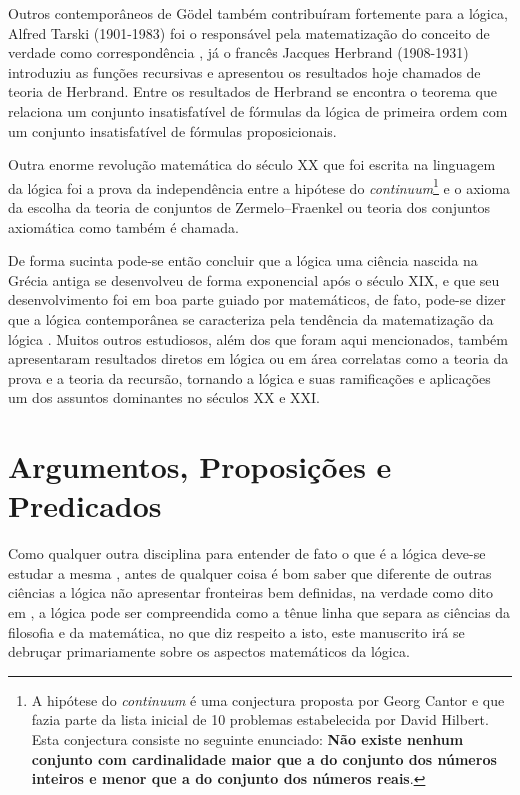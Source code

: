 Outros contemporâneos de Gödel também contribuíram fortemente para a lógica, Alfred Tarski (1901-1983) foi o responsável pela matematização do conceito de verdade como correspondência \cite{abe2002-logica, tarski1983}, já o francês Jacques Herbrand (1908-1931) introduziu as funções recursivas e apresentou os resultados hoje chamados de teoria de Herbrand. Entre os resultados de Herbrand se encontra o teorema que relaciona um conjunto insatisfatível de fórmulas da lógica de primeira ordem com um conjunto insatisfatível de fórmulas proposicionais.

Outra enorme revolução matemática do século XX que foi escrita na linguagem da lógica foi a prova da independência entre a hipótese do \textit{continuum}\footnote{A hipótese do \textit{continuum} é uma conjectura proposta por Georg Cantor e que fazia parte da lista inicial de 10 problemas estabelecida por David Hilbert. Esta conjectura consiste no seguinte enunciado: \textbf{Não existe nenhum conjunto com cardinalidade maior que a do conjunto dos números inteiros e menor que a do conjunto dos números reais}.} e o axioma da escolha da teoria de conjuntos de Zermelo–Fraenkel ou teoria dos conjuntos axiomática como também é chamada.

De forma sucinta pode-se então concluir que a lógica uma ciência nascida na Grécia antiga se desenvolveu de forma exponencial após o século XIX, e que seu desenvolvimento foi em boa parte guiado por matemáticos, de fato, pode-se dizer que a lógica contemporânea se caracteriza pela tendência da matematização da lógica \cite{barreto1998}. Muitos outros estudiosos, além dos que foram aqui mencionados, também apresentaram resultados diretos em lógica ou em área correlatas como a teoria da prova e a teoria da recursão, tornando a lógica e suas ramificações e aplicações um dos assuntos dominantes no séculos XX e XXI. 

\section{Argumentos, Proposições e Predicados}\label{sec:Argumento-Proposicao-Predicado}

Como qualquer outra disciplina para entender de fato o que é a lógica deve-se estudar a mesma \cite{copi1981}, antes de qualquer coisa é bom saber que diferente de outras ciências a lógica não apresentar fronteiras bem definidas, na verdade como dito em \cite{joaoPavao2014}, a lógica pode ser compreendida como a tênue linha que separa as ciências da filosofia e da matemática, no que diz respeito a isto, este manuscrito irá se debruçar primariamente sobre os aspectos matemáticos da lógica.

